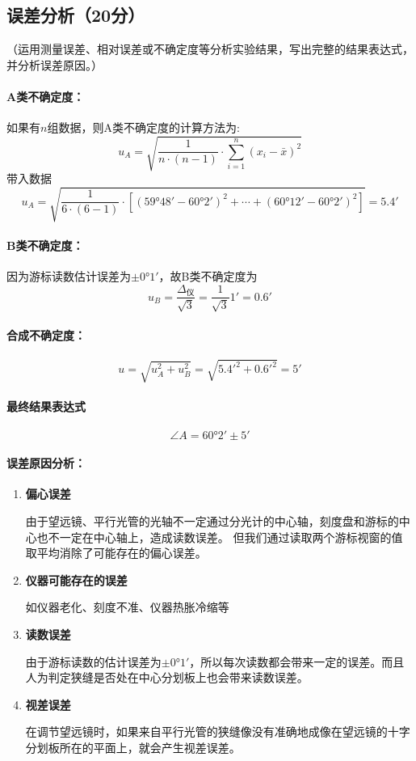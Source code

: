 \documentclass{../../templates/Report}%
\begin{document}
\subsection{误差分析（20分）}
（运用测量误差、相对误差或不确定度等分析实验结果，写出完整的结果表达式，并分析误差原因。）
\paragraph{A类不确定度：}
如果有$n$组数据，则A类不确定度的计算方法为:
\[
u_A = \sqrt{\dfrac{1}{n \cdot (n - 1)} \cdot \sum_{i = 1}^n (x_i - \bar{x})^2}
\]
带入数据
\[
u_A = \sqrt{\frac{1}{6 \cdot (6 - 1)} \cdot \left[(\ang{59;48} - \ang{60;2})^2 + \cdots + (\ang{60;12} - \ang{60;2})^2\right]} = \ang{;5.4;}
\]
\paragraph{B类不确定度：}
因为游标读数估计误差为$\pm\ang{0;1}$，故B类不确定度为
\[
u_B = \frac{\Delta_\text{仪}}{\sqrt{3}} = \frac{1}{\sqrt{3}}\ang{;1} = \ang{;0.6;}
\]
\paragraph{合成不确定度：}
\[
u = \sqrt{u_A^2 + u_B^2} = \sqrt{\ang{;5.4;}^2 + \ang{;0.6;}^2} = \ang{;5;}
\]
\paragraph{最终结果表达式}
\[\angle A = \ang{60;2} \pm \ang{;5;}\]
\paragraph{误差原因分析：}
\begin{enumerate}[label=原因\zhnum*：]
    \item \textbf{偏心误差}

    由于望远镜、平行光管的光轴不一定通过分光计的中心轴，刻度盘和游标的中心也不一定在中心轴上，造成读数误差。
    但我们通过读取两个游标视窗的值取平均消除了可能存在的偏心误差。
    \item \textbf{仪器可能存在的误差}

    如仪器老化、刻度不准、仪器热胀冷缩等
    \item \textbf{读数误差}

    由于游标读数的估计误差为$\pm\ang{0;1}$，所以每次读数都会带来一定的误差。而且人为判定狭缝是否处在中心分划板上也会带来读数误差。

    \item \textbf{视差误差}

    在调节望远镜时，如果来自平行光管的狭缝像没有准确地成像在望远镜的十字分划板所在的平面上，就会产生视差误差。

\end{enumerate}
\end{document}
